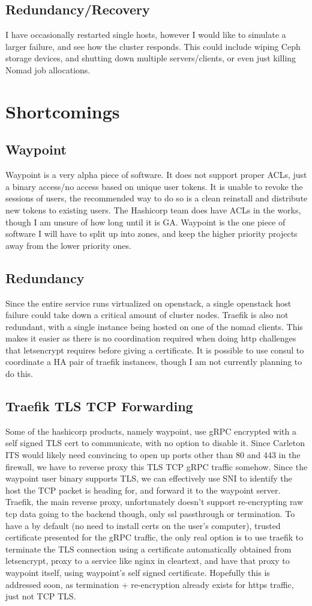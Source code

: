 \documentclass{article}
\begin{document}
\subsection{Redundancy/Recovery}
I have occasionally restarted single hosts, however I would like to simulate a larger failure, and see how the cluster responds. This could include wiping Ceph storage devices, and shutting down multiple servers/clients, or even just killing Nomad job allocations.

\section{Shortcomings}
\subsection{Waypoint}
Waypoint is a very alpha piece of software. It does not support proper ACLs, just a binary access/no access based on unique user tokens. It is unable to revoke the sessions of users, the recommended way to do so is a clean reinstall and distribute new tokens to existing users. The Hashicorp team does have ACLs in the works, though I am unsure of how long until it is GA. Waypoint is the one piece of software I will have to split up into zones, and keep the higher priority projects away from the lower priority ones. 
\subsection{Redundancy}
Since the entire service runs virtualized on openstack, a single openstack host failure could take down a critical amount of cluster nodes. Traefik is also not redundant, with a single instance being hosted on one of the nomad clients. This makes it easier as there is no coordination required when doing http challenges that letsencrypt requires before giving a certificate. It is possible to use consul to coordinate a HA pair of traefik instances, though I am not currently planning to do this. 
\subsection{Traefik TLS TCP Forwarding}
Some of the hashicorp products, namely waypoint, use gRPC encrypted with a self signed TLS cert to communicate, with no option to disable it. Since Carleton ITS would likely need convincing to open up ports other than 80 and 443 in the firewall, we have to reverse proxy this TLS TCP gRPC traffic somehow. Since the waypoint user binary supports TLS, we can effectively use SNI to identify the host the TCP packet is heading for, and forward it to the waypoint server. Traefik, the main reverse proxy, unfortunately doesn't support re-encrypting raw tcp data going to the backend though, only ssl passthrough or termination. To have a by default (no need to install certs on the user's computer), trusted certificate presented for the gRPC traffic, the only real option is to use traefik to terminate the TLS connection using a certificate automatically obtained from letsencrypt, proxy to a service like nginx in cleartext, and have that proxy to waypoint itself, using waypoint's self signed certificate. Hopefully this is addressed soon, as termination + re-encryption already exists for https traffic, just not TCP TLS.
\end{document}
